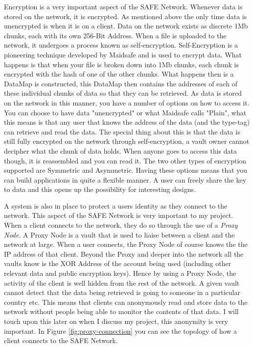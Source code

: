 Encryption is a very important aspect of the SAFE Network. Whenever data is stored on the network, it is encrypted. As mentioned above the only time data is unencrypted is when it is on a client. Data on the network exists as discrete 1Mb chunks, each with its own 256-Bit Address. When a file is uploaded to the network, it undergoes a process known as self-encryption. Self-Encryption is a pioneering technique developed by Maidsafe and is used to encrypt data. What happens is that when your file is broken down into 1Mb chunks, each chunk is encrypted with the hash of one of the other chunks. What happens then is a DataMap is constructed, this DataMap then contains the addresses of each of these individual chunks of data so that they can be retrieved. As data is stored on the network in this manner, you have a number of options on how to access it. You can choose to have data "unencrypted" or what Maidsafe calls "Plain", what this means is that any user that knows the address of the data (and the type-tag) can retrieve and read the data. The special thing about this is that the data is still fully encrypted on the network through self-encryption, a vault owner cannot decipher what the chunk of data holds. When anyone goes to access this data though, it is reassembled and you can read it. The two other types of encryption supported are Symmetric and Asymmetric. Having these options means that you can build applications in quite a flexible manner. A user can freely share the key to data and this opens up the possibility for interesting designs.

A system is also in place to protect a users identity as they connect to the network. This aspect of the SAFE Network is very important to my project. When a client connects to the network, they do so through the use of a \textit{Proxy Node}. A Proxy Node is a vault that is used to liaise between a client and the network at large. When a user connects, the Proxy Node of course knows the the IP address of that client. Beyond the Proxy and deeper into the network all the vaults know is the XOR Address of the account being used (including other relevant data and public encryption keys). Hence by using a Proxy Node, the activity of the client is well hidden from the rest of the network. A given vault cannot detect that the data being retrieved is going to someone in a particular country etc. This means that clients can anonymously read and store data to the network without people being able to monitor the contents of that data. I will touch upon this later on when I discuss my project, this anonymity is very important. In Figure \ref{fig:proxy-connection} you can see the topology of how a client connects to the SAFE Network.

